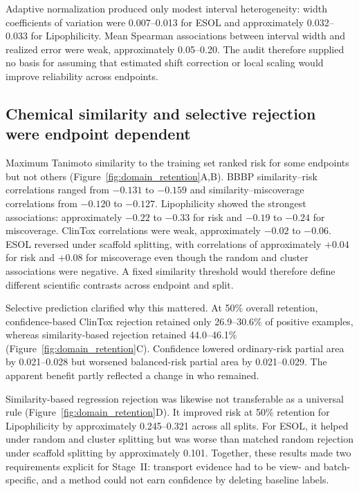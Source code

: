 Adaptive normalization produced only modest interval heterogeneity: width coefficients of variation were 0.007--0.013 for ESOL and approximately 0.032--0.033 for Lipophilicity. Mean Spearman associations between interval width and realized error were weak, approximately 0.05--0.20. The audit therefore supplied no basis for assuming that estimated shift correction or local scaling would improve reliability across endpoints.

\subsection{Chemical similarity and selective rejection were endpoint dependent}
\label{sec:results_domain}

Maximum Tanimoto similarity to the training set ranked risk for some endpoints but not others (Figure~\ref{fig:domain_retention}A,B). BBBP similarity--risk correlations ranged from $-0.131$ to $-0.159$ and similarity--miscoverage correlations from $-0.120$ to $-0.127$. Lipophilicity showed the strongest associations: approximately $-0.22$ to $-0.33$ for risk and $-0.19$ to $-0.24$ for miscoverage. ClinTox correlations were weak, approximately $-0.02$ to $-0.06$. ESOL reversed under scaffold splitting, with correlations of approximately $+0.04$ for risk and $+0.08$ for miscoverage even though the random and cluster associations were negative. A fixed similarity threshold would therefore define different scientific contrasts across endpoint and split.

Selective prediction clarified why this mattered. At 50\% overall retention, confidence-based ClinTox rejection retained only 26.9--30.6\% of positive examples, whereas similarity-based rejection retained 44.0--46.1\% (Figure~\ref{fig:domain_retention}C). Confidence lowered ordinary-risk partial area by 0.021--0.028 but worsened balanced-risk partial area by 0.021--0.029. The apparent benefit partly reflected a change in who remained.

Similarity-based regression rejection was likewise not transferable as a universal rule (Figure~\ref{fig:domain_retention}D). It improved risk at 50\% retention for Lipophilicity by approximately 0.245--0.321 across all splits. For ESOL, it helped under random and cluster splitting but was worse than matched random rejection under scaffold splitting by approximately 0.101. Together, these results made two requirements explicit for Stage~II: transport evidence had to be view- and batch-specific, and a method could not earn confidence by deleting baseline labels.

